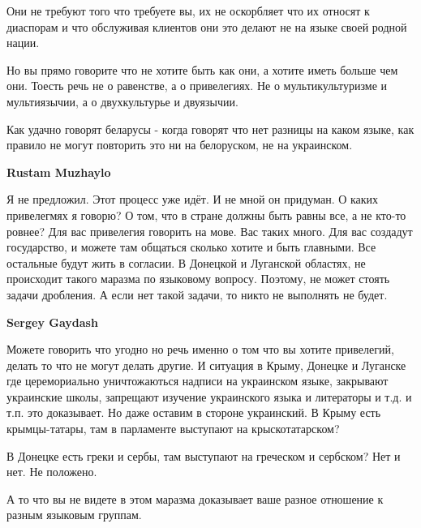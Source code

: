 \begin{itemize}
\begin{itemize}
Они не требуют того что требуете вы, их не оскорбляет что их относят к
диаспорам и что обслуживая клиентов они это делают не на языке своей родной
нации.

Но вы прямо говорите что не хотите быть как они, а хотите иметь больше чем они.
Тоесть речь не о равенстве, а о привелегиях. Не о мультикультуризме и
мультиязычии, а о двухкультурье и двуязычии.

Как удачно говорят беларусы - когда говорят что нет разницы на каком языке, как
правило не могут повторить это ни на белоруском, не на украинском.

 
\textbf{Rustam Muzhaylo} 

Я не предложил. Этот процесс уже идёт. И не мной он
придуман. О каких привелегмях я говорю? О том, что в стране должны быть равны
все, а не кто-то ровнее? Для вас привелегия говорить на мове. Вас таких много.
Для вас создадут государство, и можете там общаться сколько хотите и быть
главными. Все остальные будут жить в согласии. В Донецкой и Луганской областях,
не происходит такого маразма по языковому вопросу. Поэтому, не может стоять
задачи дробления. А если нет такой задачи, то никто не выполнять не будет.

 
\textbf{Sergey Gaydash}

Можете говорить что угодно но речь именно о том что вы хотите привелегий,
делать то что не могут делать другие. И ситуация в Крыму, Донецке и Луганске
где церемориально уничтожаються надписи на украинском языке, закрывают
украинские школы, запрещают изучение украинского языка и литераторы и т.д. и
т.п. это доказывает. Но даже оставим в стороне украинский. В Крыму есть
крымцы-татары, там в парламенте выступают на крыскотатарском?

В Донецке есть греки и сербы, там выступают на греческом и сербском? Нет и нет.
Не положено.

А то что вы не видете в этом маразма доказывает ваше разное отношение к разным
языковым группам.


\end{itemize}
\end{itemize}
